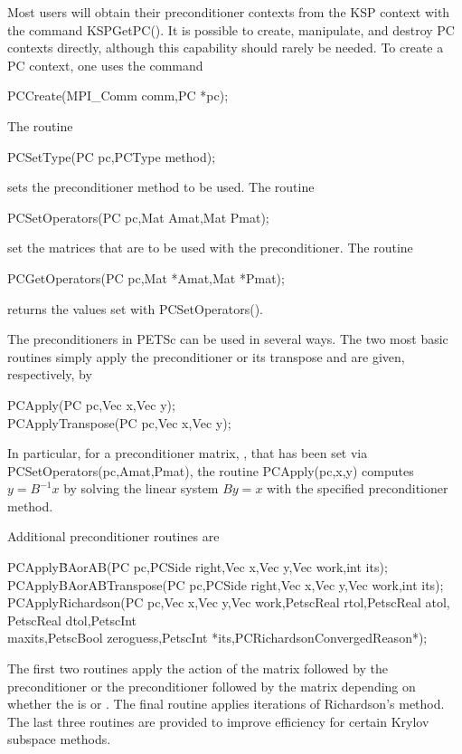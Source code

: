 {{Most users will obtain their preconditioner contexts from the KSP
context with the command KSPGetPC(). It is possible to create,
manipulate, and destroy PC contexts directly, although this capability
should rarely be needed. To create a PC context, one uses the command
\begin{tabbing}
  PCCreate(MPI\_Comm comm,PC *pc);
\end{tabbing}
The routine
\begin{tabbing}
  PCSetType(PC pc,PCType method);
\end{tabbing}
sets the preconditioner method to be used.
The routine
\begin{tabbing}
  PCSetOperators(PC pc,Mat Amat,Mat Pmat);\\
\end{tabbing}
set the matrices that are to be used with
the preconditioner.
The routine
\begin{tabbing}
  PCGetOperators(PC pc,Mat *Amat,Mat *Pmat);
\end{tabbing}
returns the values set with PCSetOperators().

The preconditioners in PETSc can be used in several ways.  The two
most basic routines simply apply the preconditioner or its transpose
and are given, respectively, by
\begin{tabbing}
  PCApply(PC pc,Vec x,Vec y);\\
  PCApplyTranspose(PC pc,Vec x,Vec y);
\end{tabbing}
In particular, for a preconditioner matrix, , that has
been set via PCSetOperators(pc,Amat,Pmat),
the routine PCApply(pc,x,y) computes $y = B^{-1} x$
by solving the linear system $By = x$ with the specified preconditioner
method.

Additional preconditioner routines are
\begin{tabbing}
  PCApply\=BAorAB(PC pc,PCSide right,Vec x,Vec y,Vec work,int its);\\
  PCApplyBAorABTranspose(PC pc,PCSide right,Vec x,Vec y,Vec work,int its);\\
  PCApplyRichardson(PC pc,Vec x,Vec y,Vec work,PetscReal rtol,PetscReal atol, PetscReal dtol,PetscInt \\
   \>  maxits,PetscBool  zeroguess,PetscInt *its,PCRichardsonConvergedReason*);
\end{tabbing}
The first two routines apply the action of the matrix followed by the
preconditioner or the preconditioner followed by the matrix depending
on whether the   is
 or . The final routine applies  iterations of
Richardson's method.   
The last three routines are provided to improve
efficiency for certain Krylov subspace methods.

}}
